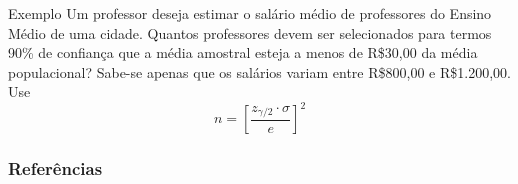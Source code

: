 \documentclass[14pt,aspectratio=1610]{beamer}
\begin{document}
	\begin{frame}{}
		\begin{block}{Exemplo}
			\justifying
			Um professor deseja estimar o salário médio de professores do Ensino Médio de uma cidade. Quantos professores devem ser selecionados para termos 90\% de confiança que a média amostral esteja a menos de R\$30,00 da média populacional? Sabe-se apenas que os
			salários variam entre R\$800,00 e R\$1.200,00. Use
			$$
			n = \left[ \frac{z_{\gamma/2} \cdot \sigma}{e} \right]^2
			$$  
			\nocite{Apostila}
		\end{block}
		\nocite{Morettin09, Apostila, eric, montgomery2016, meyer1982probabilidade, Bastos2025}
	\end{frame}
	
	\begin{frame}[allowframebreaks]
		\frametitle{\bf Referências}
		\printbibliography
	\end{frame}
	
	
\end{document}

